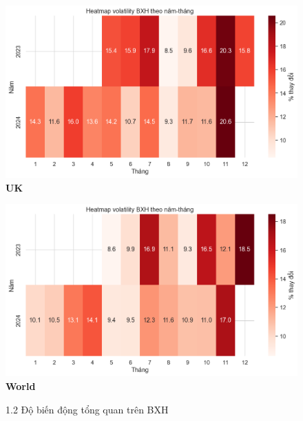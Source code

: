 \begin{itemize}
\begin{figure}[H]
        \begin{minipage}{0.45\textwidth}
            \centering
            \includegraphics[width=\linewidth]{../graphics/data_top50/figure/14/EDA_uk.png}
            \\[4pt] {\small \textbf{UK}}
        \end{minipage}
        \hfill
        \begin{minipage}{0.45\textwidth}
            \centering
            \includegraphics[width=\linewidth]{../graphics/data_top50/figure/14/EDA_world.png}
            \\[4pt] {\small \textbf{World}}
        \end{minipage}

        \caption{1.2 Độ biến động tổng quan trên BXH}
        \label{fig:energy-regions}

        
    \end{figure}




\end{itemize}
